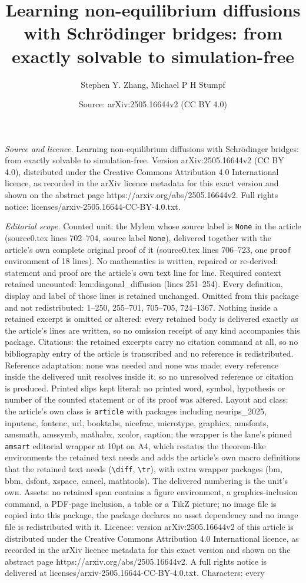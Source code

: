 \documentclass[10pt,a4paper]{amsart}
\title[Learning non-equilibrium diffusions with Schr\"odinger bridg]{Learning non-equilibrium diffusions with Schr\"odinger bridges: from exactly solvable to simulation-free}
\author{Stephen Y. Zhang, Michael P H Stumpf}
\date{Source: arXiv:2505.16644v2 (CC BY 4.0)}
\begin{document}
\maketitle

\noindent\emph{Source and licence.} Learning non-equilibrium diffusions with Schr\"odinger bridges: from exactly solvable to simulation-free. Version arXiv:2505.16644v2 (CC BY 4.0), distributed under the Creative Commons Attribution 4.0 International licence, as recorded in the arXiv licence metadata for this exact version and shown on the abstract page https://arxiv.org/abs/2505.16644v2. Full rights notice: licenses/arxiv-2505.16644-CC-BY-4.0.txt.\par\smallskip

\noindent\textit{Editorial scope.} Counted unit: the Mylem whose source label is \texttt{None} in the article (source0.tex lines 702--704, source label \texttt{None}), delivered together with the article's own complete original proof of it (source0.tex lines 706--723, one \texttt{proof} environment of 18 lines). No mathematics is written, repaired or re-derived: statement and proof are the article's own text line for line. Required context retained uncounted: lem:diagonal\_diffusion (lines 251--254). Every definition, display and label of those lines is retained unchanged. Omitted from this package and not redistributed: 1--250, 255--701, 705--705, 724--1367. Nothing inside a retained excerpt is omitted or altered: every retained body is delivered exactly as the article's lines are written, so no omission receipt of any kind accompanies this package. Citations: the retained excerpts carry no citation command at all, so no bibliography entry of the article is transcribed and no reference is redistributed. Reference adaptation: none was needed and none was made; every reference inside the delivered unit resolves inside it, so no unresolved reference or citation is produced. Printed slips kept literal: no printed word, symbol, hypothesis or number of the counted statement or of its proof was altered. Layout and class: the article's own class is \texttt{article} with packages including neurips\_2025, inputenc, fontenc, url, booktabs, nicefrac, microtype, graphicx, amsfonts, amsmath, amssymb, mathabx, xcolor, caption; the wrapper is the lane's pinned \texttt{amsart} editorial wrapper at 10pt on A4, which restates the theorem-like environments the retained text needs and adds the article's own macro definitions that the retained text needs (\texttt{\textbackslash diff}, \texttt{\textbackslash tr}), with extra wrapper packages (bm, bbm, dsfont, xspace, cancel, mathtools). The delivered numbering is the unit's own. Assets: no retained span contains a figure environment, a graphics-inclusion command, a PDF-page inclusion, a table or a TikZ picture; no image file is copied into this package, the package declares no asset dependency and no image file is redistributed with it. Licence: version arXiv:2505.16644v2 of this article is distributed under the Creative Commons Attribution 4.0 International licence, as recorded in the arXiv licence metadata for this exact version and shown on the abstract page https://arxiv.org/abs/2505.16644v2. A full rights notice is delivered at licenses/arxiv-2505.16644-CC-BY-4.0.txt. Characters: every 
\end{document}
